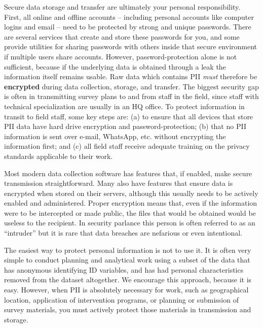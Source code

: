 Secure data storage and transfer are ultimately your personal responsibility.
First, all online and offline accounts
-- including personal accounts like computer logins and email --
need to be protected by strong and unique passwords.
There are several services that create and store these passwords for you,
and some provide utilities for sharing passwords with others
inside that secure environment if multiple users share accounts.
However, password-protection alone is not sufficient,
because if the underlying data is obtained through a leak the information itself remains usable.
Raw data which contains PII \textit{must} therefore be \textbf{encrypted}
during data collection, storage, and transfer.
The biggest security gap is often in transmitting survey plans to and from staff in the field,
since staff with technical specialization are usually in an HQ office.
To protect information in transit to field staff, some key steps are:
(a) to ensure that all devices that store PII data have hard drive encryption and password-protection;
(b) that no PII information is sent over e-mail, WhatsApp, etc. without encrypting the information first;
and (c) all field staff receive adequate training on the privacy standards applicable to their work.

Most modern data collection software has features that,
if enabled, make secure transmission straightforward.
Many also have features that ensure data is encrypted when stored on their servers,
although this usually needs to be actively enabled and administered.
Proper encryption means that,
even if the information were to be intercepted or made public,
the files that would be obtained would be useless to the recipient.
In security parlance this person is often referred to as an ``intruder''
but it is rare that data breaches are nefarious or even intentional.

The easiest way to protect personal information is not to use it.
It is often very simple to conduct planning and analytical work
using a subset of the data that has anonymous identifying ID variables,
and has had personal characteristics removed from the dataset altogether.
We encourage this approach, because it is easy.
However, when PII is absolutely necessary for work,
such as geographical location, application of intervention programs,
or planning or submission of survey materials,
you must actively protect those materials in transmission and storage.

